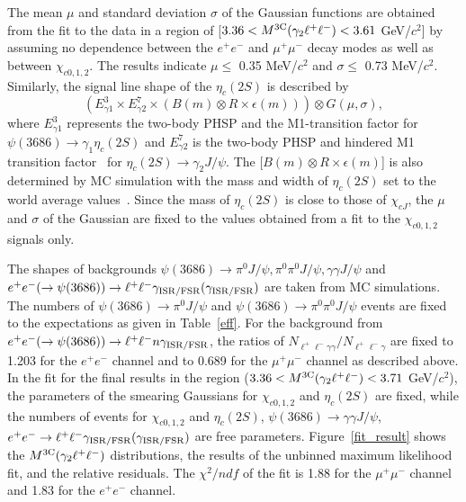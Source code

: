 \documentclass[prd,twocolumn,showpacs,amsmath,amssymb]{revtex4-1}
\begin{document}
The mean $\mu$ and standard deviation $\sigma$ of the Gaussian functions are obtained from the fit to the data in a region of [$3.36 < M^{\rm 3C}(\gamma_{2}\ell^{+}\ell^{-}) < 3.61$ GeV/$c^{2}$] by assuming no dependence between the $e^+e^-$ and $\mu^+\mu^-$ decay modes as well as between $\chi_{c0,1,2}$. The results indicate $\mu\leq$ 0.35 MeV/$c^2$ and $\sigma\leq$ 0.73 MeV/$c^2$.
Similarly, the signal line shape of the $\eta_{c}(2S)$ is described by
%
\begin{equation}\label{etacp_line}
(E_{\gamma 1}^{3}\times E_{\gamma 2}^{7}\times (B(m)\otimes R\times\epsilon(m)))\otimes G(\mu,\sigma),
\end{equation}
%
\noindent where $E_{\gamma 1}^{3}$ represents the two-body {\sc PHSP} and the M1-transition factor for
$\psi(3686)\rightarrow\gamma_{1}\eta_{c}(2S)$ and $E_{\gamma 2}^{7}$ is the two-body {\sc PHSP} and hindered M1 transition
factor~\cite{Theory_1,Theory_2} for $\eta_{c}(2S)\rightarrow\gamma_{2}J/\psi$. The [$B(m)\otimes R\times\epsilon(m)$] is also determined by MC simulation with the mass and width of $\eta_{c}(2S)$ set to the
world average values~\cite{PDG}. Since the mass of $\eta_{c}(2S)$ is close to those of $\chi_{cJ}$,
the $\mu$ and $\sigma$ of the Gaussian are fixed to the values obtained from a fit to the $\chi_{c0,1,2}$ signals only.

The shapes of backgrounds $\psi(3686)\to\pi^{0}J/\psi,\pi^{0}\pi^{0}J/\psi,\gamma\gamma J/\psi$ and
$e^{+}e^{-}(\to\psi(3686))\rightarrow \ell^{+}\ell^{-}\gamma_{\rm ISR/FSR}(\gamma_{\rm ISR/FSR})$ are taken from MC simulations.
The numbers of $\psi(3686)\rightarrow\pi^{0}J/\psi$ and $\psi(3686)\rightarrow\pi^{0}\pi^{0}J/\psi$ events are fixed to the expectations as given in Table~\ref{eff}.
For the background from $e^{+}e^{-}(\to\psi(3686))\rightarrow \ell^{+}\ell^{-} n\gamma_{\rm ISR/FSR}$, the ratios of
$N_{\ell^{+}\ell^{-}\gamma\gamma}/N_{\ell^{+}\ell^{-}\gamma}$ are fixed to 1.203 for the $e^+e^-$ channel and to 0.689 for the $\mu^+\mu^-$ channel as described above.
In the fit for the final results in the region ($3.36 < M^{\rm 3C}(\gamma_{2}\ell^{+}\ell^{-}) < 3.71$ GeV/$c^{2}$), the parameters of the smearing Gaussians for $\chi_{c0,1,2}$ and $\eta_{c}(2S)$ are fixed, while the numbers of events for $\chi_{c0,1,2}$
and $\eta_{c}(2S)$, $\psi(3686)\rightarrow\gamma\gamma J/\psi$, $e^{+}e^{-}\rightarrow \ell^{+}\ell^{-}\gamma_{\rm ISR/FSR}(\gamma_{\rm ISR/FSR})$
are free parameters. Figure~\ref{fit_result} shows the $M^{\rm 3C}(\gamma_{2}\ell^{+}\ell^{-})$ distributions,
the results of the unbinned maximum likelihood fit, and the relative residuals. The $\chi^{2}/ndf$ of the fit is 1.88 for the $\mu^{+}\mu^{-}$ channel and 1.83
for the $e^{+}e^{-}$ channel.
\end{document}
